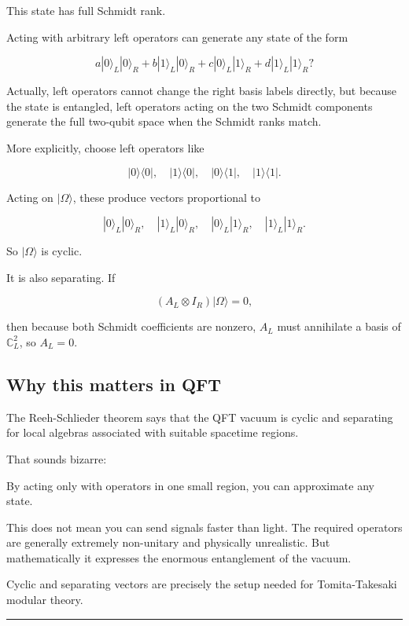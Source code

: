 \documentclass[11pt,a4paper]{article}
\newenvironment{qiqtquote}{\begin{mdframed}[style=quotestyle]}{\end{mdframed}}
\begin{document}
This state has full Schmidt rank.

Acting with arbitrary left operators can generate any state of the form

\[
a|0\rangle_L|0\rangle_R
+
b|1\rangle_L|0\rangle_R
+
c|0\rangle_L|1\rangle_R
+
d|1\rangle_L|1\rangle_R?
\]

Actually, left operators cannot change the right basis labels directly, but because the state is entangled, left operators acting on the two Schmidt components generate the full two-qubit space when the Schmidt ranks match.

More explicitly, choose left operators like

\[
|0\rangle\langle0|,\quad |1\rangle\langle0|,\quad |0\rangle\langle1|,\quad |1\rangle\langle1|.
\]

Acting on $|\Omega\rangle$, these produce vectors proportional to

\[
|0\rangle_L|0\rangle_R,\quad
|1\rangle_L|0\rangle_R,\quad
|0\rangle_L|1\rangle_R,\quad
|1\rangle_L|1\rangle_R.
\]

So $|\Omega\rangle$ is cyclic.

It is also separating. If

\[
(A_L\otimes I_R)|\Omega\rangle=0,
\]

then because both Schmidt coefficients are nonzero, $A_L$ must annihilate a basis of $\mathbb{C}^2_L$, so $A_L=0$.

\subsection{Why this matters in QFT}

The Reeh-Schlieder theorem says that the QFT vacuum is cyclic and separating for local algebras associated with suitable spacetime regions.

That sounds bizarre:

\begin{qiqtquote}
By acting only with operators in one small region, you can approximate any state.
\end{qiqtquote}

This does not mean you can send signals faster than light. The required operators are generally extremely non-unitary and physically unrealistic. But mathematically it expresses the enormous entanglement of the vacuum.

Cyclic and separating vectors are precisely the setup needed for Tomita-Takesaki modular theory.

\medskip\hrule\medskip
\end{document}
